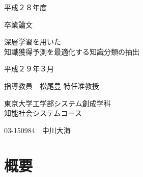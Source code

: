 \documentclass[a4j,11pt]{jreport}
\begin{document}
\begin{center}
\vspace*{1.6cm}
\Large 平成２８年度

\vspace*{0.4cm}
\Large 卒業論文

\vspace*{1.6cm}

\LARGE 深層学習を用いた\\知識獲得予測を最適化する知識分類の抽出
\vspace{6.4cm}

\Large 平成２９年３月

\vspace{0.2cm}
\Large 指導教員　松尾豊 特任准教授

\vspace{0.6cm}
\Large 東京大学工学部システム創成学科\\知能社会システムコース

\vspace{0.2cm}
\Large 03-150984　中川大海


\end{center}
\normalsize
\thispagestyle{empty}
\clearpage

\chapter*{概要}

\renewcommand{\baselinestretch}{1.3} 




\newpage
{}
\tableofcontents
\newpage
\listoffigures
\newpage
\listoftables
\newpage


\pagestyle{fancy}










\newpage
{}
\label{chap:reference}
\fancyhf{}
\rhead{\thepage}
\cfoot{\thepage}

%





%

\end{document}
